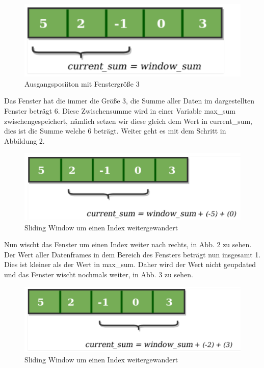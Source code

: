 \documentclass{article}
\begin{document}
\begin{center}
\begin{figure}[h]
    \centering
    \includegraphics[width=\textwidth]{slidingwindow1.png}
    \caption{Ausgangsposiiton mit Fenstergröße 3}
\end{figure}
\end{center}
\break

Das Fenster hat die immer die Größe 3, die Summe aller Daten im dargestellten Fenster beträgt 6. Diese Zwischensumme wird in einer Variable max\_sum zwischengespeichert, nämlich
setzen wir diese gleich dem Wert in current\_sum, dies ist die Summe welche 6 beträgt. Weiter geht es mit dem Schritt in Abbildung 2.

\begin{center}
\begin{figure}[h]
    \centering
    \includegraphics[width=\textwidth]{slidingwindow2.png}
    \caption{Sliding Window um einen Index weitergewandert}
\end{figure}
\end{center}

Nun wischt das Fenster um einen Index weiter nach rechts, in Abb. 2 zu sehen. Der Wert aller Datenframes in dem Bereich des Fensters beträgt nun insgesamt 1. Dies ist kleiner als der Wert in max\_sum. Daher wird der Wert nicht geupdated und das Fenster wischt nochmals weiter, in Abb. 3 zu sehen.

\begin{center}
\begin{figure}[h]
    \centering
    \includegraphics[width=\textwidth]{slidingwindow3.png}
    \caption{Sliding Window um einen Index weitergewandert}
\end{figure}
\end{center}
\break
\end{document}
